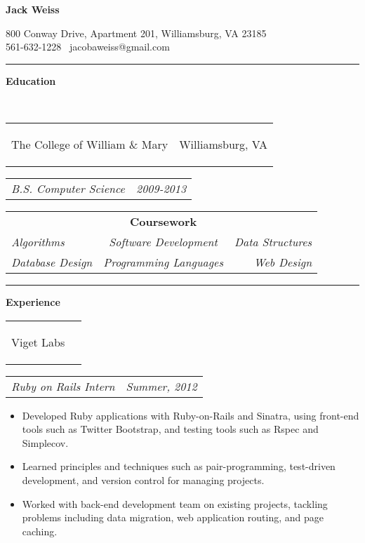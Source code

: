 \documentclass[11pt]{article}
\makeatletter
\newcommand{\headerrow}[2]
{\begin{tabular*}{\linewidth}{l@{\extracolsep{\fill}}r}
	#1 &
	#2 \\
\end{tabular*}}
\makeatother
\begin{document}
\begin{center}
	\begin{huge}
		\bf Jack Weiss
	\end{huge}

	800 Conway Drive, Apartment 201, Williamsburg, VA 23185 \\
	561-632-1228 \textbullet\ jacobaweiss@gmail.com
\end{center}
\hrule
\vspace{0.5em}

\begin{LARGE}
	\bf Education
\end{LARGE} 
\vspace{0.5em} \\
\headerrow
	{\begin{Large}The College of William \& Mary\end{Large}}
	{Williamsburg, VA}
\headerrow
	{\textit{B.S. Computer Science}}
	{\textit{2009-2013}}
\vspace{-1.5em}
\begin{center}
	\begin{tabular}{lcr}
		& {\bf Coursework}  & \\
		\textit{Algorithms} & \textit{Software Development} & \textit{Data Structures} \\
		\textit{Database Design} & \textit{Programming Languages} & \textit{Web Design}
		
	\end{tabular}
\end{center}
\hrule
\vspace{0.5em}

\begin{LARGE}
	\bf Experience
\end{LARGE} 
\vspace{0.5em}

	\headerrow
		{\begin{Large}Viget Labs\end{Large}}
		{}
	\headerrow
		{\textit{Ruby on Rails Intern}}
		{\textit{Summer, 2012}}
	\begin{itemize}
		\item Developed Ruby applications with Ruby-on-Rails and Sinatra, using front-end tools such as Twitter Bootstrap, and testing tools such as Rspec and Simplecov.
		\vspace{-0.8em}
		\item Learned principles and techniques such as pair-programming, test-driven development, and version control for managing projects.
		\vspace{-0.8em}
		\item Worked with back-end development team on existing projects, tackling problems including data migration, web application routing, and page caching.
	\end{itemize}
	
\end{document}
